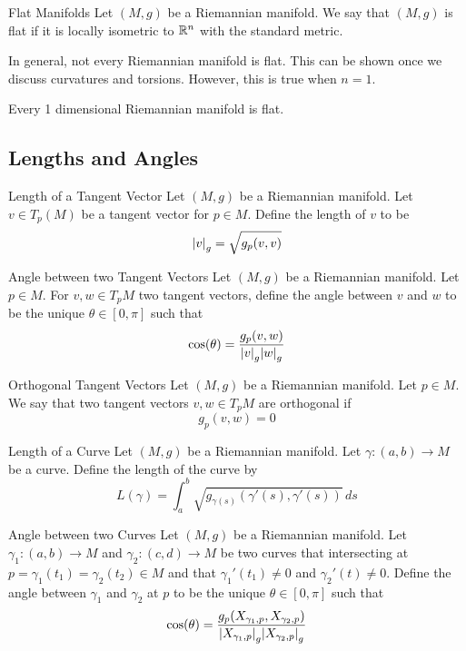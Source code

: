 \documentclass[a4paper]{article}
\begin{document}
\begin{defn}{Flat Manifolds}{} Let $(M,g)$ be a Riemannian manifold. We say that $(M,g)$ is flat if it is locally isometric to $\mathbb{R}^n$ with the standard metric. 
\end{defn}

In general, not every Riemannian manifold is flat. This can be shown once we discuss curvatures and torsions. However, this is true when $n=1$. 

\begin{lmm}{}{} Every 1 dimensional Riemannian manifold is flat. 
\end{lmm}

\subsection{Lengths and Angles}
\begin{defn}{Length of a Tangent Vector}{} Let $(M,g)$ be a Riemannian manifold. Let $v\in T_p(M)$ be a tangent vector for $p\in M$. Define the length of $v$ to be $$\abs{v}_g=\sqrt{g_p(v,v)}$$
\end{defn}

\begin{defn}{Angle between two Tangent Vectors}{} Let $(M,g)$ be a Riemannian manifold. Let $p\in M$. For $v,w\in T_pM$ two tangent vectors, define the angle between $v$ and $w$ to be the unique $\theta\in[0,\pi]$ such that $$\cos(\theta)=\frac{g_p(v,w)}{\abs{v}_g\abs{w}_g}$$
\end{defn}

\begin{defn}{Orthogonal Tangent Vectors}{} Let $(M,g)$ be a Riemannian manifold. Let $p\in M$. We say that two tangent vectors $v,w\in T_pM$ are orthogonal if $$g_p(v,w)=0$$
\end{defn}

\begin{defn}{Length of a Curve}{} Let $(M,g)$ be a Riemannian manifold. Let $\gamma:(a,b)\to M$ be a curve. Define the length of the curve by $$L(\gamma)=\int_a^b\sqrt{g_{\gamma(s)}(\gamma'(s),\gamma'(s))}\,ds$$
\end{defn}

\begin{defn}{Angle between two Curves}{} Let $(M,g)$ be a Riemannian manifold. Let $\gamma_1:(a,b)\to M$ and $\gamma_2:(c,d)\to M$ be two curves that intersecting at $p=\gamma_1(t_1)=\gamma_2(t_2)\in M$ and that $\gamma_1'(t_1)\neq 0$ and $\gamma_2'(t)\neq 0$. Define the angle between $\gamma_1$ and $\gamma_2$ at $p$ to be the unique $\theta\in[0,\pi]$ such that $$\cos(\theta)=\frac{g_p(X_{\gamma_1,p},X_{\gamma_2,p})}{\abs{X_{\gamma_1,p}}_g\abs{X_{\gamma_2,p}}_g}$$
\end{defn}
\end{document}
